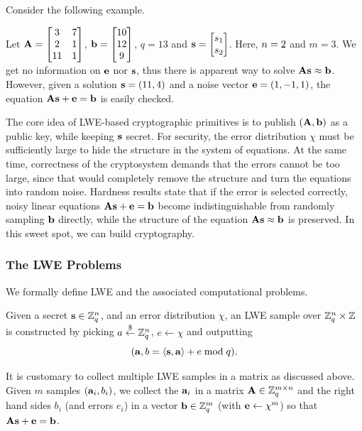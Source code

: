 Consider the following example.
\begin{example}
    Let $\mathbf{A} = \begin{bmatrix}
        3 & 7 \\ 2 & 1 \\ 11 & 1
    \end{bmatrix}$, $\mathbf{b} = \begin{bmatrix}
        10 \\ 12 \\ 9
    \end{bmatrix}$, $q = 13$ and $\mathbf{s} = \begin{bmatrix}
        s_1 \\ s_2
    \end{bmatrix}$. Here, $n = 2$ and $m = 3$. We get no information on $\mathbf{e}$ nor $\mathbf{s}$, thus there is apparent way to solve $\mathbf{A} \mathbf{s} \approx \mathbf{b}$. However, given a solution $\mathbf{s} = (11, 4)$ and a noise vector $\mathbf{e} = (1, -1, 1)$, the equation $\mathbf{A} \mathbf{s} + \mathbf{e} = \mathbf{b}$ is easily checked.
\end{example}

The core idea of LWE-based cryptographic primitives is to publish $(\mathbf{A}, \mathbf{b})$ as a public key, while keeping $\mathbf{s}$ secret. For security, the error distribution $\chi$ must be sufficiently large to hide the structure in the system of equations. At the same time, correctness of the cryptosystem demands that the errors cannot be too large, since that would completely remove the structure and turn the equations into random noise. Hardness results state that if the error is selected correctly, noisy linear equations $\mathbf{A} \mathbf{s} + \mathbf{e} = \mathbf{b}$ become indistinguishable from randomly sampling $\mathbf{b}$ directly, while the structure of the equation $\mathbf{A} \mathbf{s} \approx \mathbf{b}$ is preserved. In this sweet spot, we can build cryptography.

\subsubsection{The LWE Problems}
We formally define LWE and the associated computational problems.
\begin{definition}
    Given a secret $\mathbf{s} \in \mathbb{Z}^{n}_q$, and an error distribution $\chi$, an LWE sample over $\mathbb{Z}_q^{n} \times \mathbb{Z}$ is constructed by picking $a \overset{\$}{\leftarrow} \mathbb{Z}_q^{n}$, $e \leftarrow \chi$ and outputting
    \[ (\mathbf{a}, b = \langle \mathbf{s}, \mathbf{a} \rangle + e \mathrm{\; mod \;} q). \]
\end{definition}
It is customary to collect multiple LWE samples in a matrix as discussed above. Given $m$ samples $(\mathbf{a}_i, b_i)$, we collect the $\mathbf{a}_i$ in a matrix $\mathbf{A} \in \mathbb{Z}_q^{m \times n}$ and the right hand sides $b_i$ (and errors $e_i$) in a vector $\mathbf{b} \in \mathbb{Z}_q^m$ (with $\mathbf{e} \leftarrow \chi^m$) so that $\mathbf{A} \mathbf{s} + \mathbf{e} = \mathbf{b}$.

